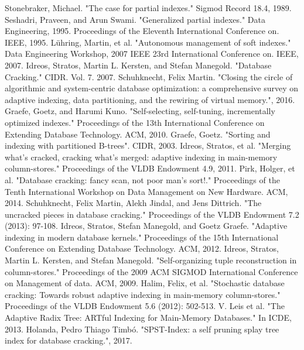 \documentclass[10pt, conference, compsocconf]{IEEEtran}
\begin{document}
\begin{thebibliography}{8}

Stonebraker, Michael. "The case for partial indexes." Sigmod Record 18.4, 1989.
Seshadri, Praveen, and Arun Swami. "Generalized partial indexes." Data Engineering, 1995. Proceedings of the Eleventh International Conference on. IEEE, 1995.
L\"uhring, Martin, et al. "Autonomous management of soft indexes." Data Engineering Workshop, 2007 IEEE 23rd International Conference on. IEEE, 2007.
Idreos, Stratos, Martin L. Kersten, and Stefan Manegold. "Database Cracking." CIDR. Vol. 7. 2007.
Schuhknecht, Felix Martin. "Closing the circle of algorithmic and system-centric database optimization: a comprehensive survey on adaptive indexing, data partitioning, and the rewiring of virtual memory.", 2016.
Graefe, Goetz, and Harumi Kuno. "Self-selecting, self-tuning, incrementally optimized indexes." Proceedings of the 13th International Conference on Extending Database Technology. ACM, 2010.
Graefe, Goetz. "Sorting and indexing with partitioned B-trees". CIDR, 2003.
Idreos, Stratos, et al. "Merging what's cracked, cracking what's merged: adaptive indexing in main-memory column-stores." Proceedings of the VLDB Endowment 4.9, 2011.
Pirk, Holger, et al. "Database cracking: fancy scan, not poor man's sort!." Proceedings of the Tenth International Workshop on Data Management on New Hardware. ACM, 2014.
Schuhknecht, Felix Martin, Alekh Jindal, and Jens Dittrich. "The uncracked pieces in database cracking." Proceedings of the VLDB Endowment 7.2 (2013): 97-108.
Idreos, Stratos, Stefan Manegold, and Goetz Graefe. "Adaptive indexing in modern database kernels." Proceedings of the 15th International Conference on Extending Database Technology. ACM, 2012.
Idreos, Stratos, Martin L. Kersten, and Stefan Manegold. "Self-organizing tuple reconstruction in column-stores." Proceedings of the 2009 ACM SIGMOD International Conference on Management of data. ACM, 2009.
Halim, Felix, et al. "Stochastic database cracking: Towards robust adaptive indexing in main-memory column-stores." Proceedings of the VLDB Endowment 5.6 (2012): 502-513.
V. Leis et al. "The Adaptive Radix Tree: ARTful Indexing for
Main-Memory Databases." In ICDE, 2013.
Holanda, Pedro Thiago Timbó. "SPST-Index: a self pruning splay tree index for database cracking.", 2017.

\end{thebibliography}
\end{document}
